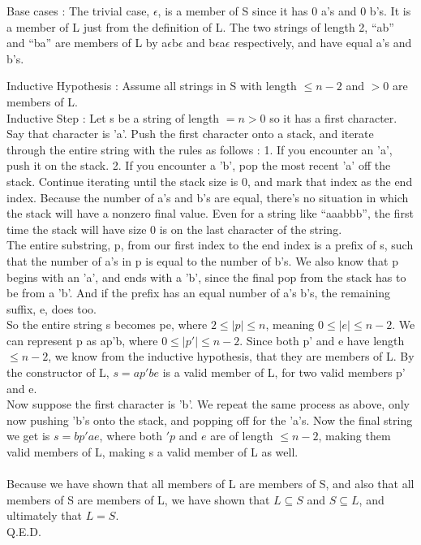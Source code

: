 \begin{enumerate}
  Base cases : The trivial case, $\epsilon$, is a member of S since it has 0 a's and 0 b's. It is a member of L just from the definition of L. The two strings of length 2, ``ab'' and ``ba'' are members of L by a$\epsilon$b$\epsilon$ and b$\epsilon$a$\epsilon$ respectively, and have equal a's and b's.
  
  Inductive Hypothesis : Assume all strings in S with length $\leq n-2$ and $> 0$ are members of L.\\

  Inductive Step : Let s be a string of length $ = n > 0$ so it has a first character. \\

  Say that character is 'a'. Push the first character onto a stack, and iterate through the entire string with the rules as follows : 1. If you encounter an 'a', push it on the stack. 2. If you encounter a 'b', pop the most recent 'a' off the stack. Continue iterating until the stack size is 0, and mark that index as the end index. Because the number of a's and b's are equal, there's no situation in which the stack will have a nonzero final value. Even for a string like ``aaabbb'', the first time the stack will have size 0 is on the last character of the string.\\
  The entire substring, p, from our first index to the end index is a prefix of s, such that the number of a's in p is equal to the number of b's. We also know that p begins with an 'a', and ends with a 'b', since the final pop from the stack has to be from a 'b'. And if the prefix has an equal number of a's b's, the remaining suffix, e, does too.\\
  So the entire string s becomes pe, where $2 \leq |p| \leq n$, meaning $0 \leq |e| \leq n-2$. We can represent p as ap'b, where $0 \leq |p'| \leq n-2$. Since both p' and e have length $\leq n-2$, we know from the inductive hypothesis, that they are members of L. By the constructor of L, $s = ap'be$ is a valid member of L, for two valid members p' and e.\\

  Now suppose the first character is 'b'. We repeat the same process as above, only now pushing 'b's onto the stack, and popping off for the 'a's. Now the final string we get is $s = bp'ae$, where both $'p$ and $e$ are of length $\leq n-2$, making them valid members of L, making s a valid member of L as well.\\\\

  Because we have shown that all members of L are members of S, and also that all members of S are members of L, we have shown that $L \subseteq S$ and $S \subseteq L$, and ultimately that $L = S$. \\
  Q.E.D.
  
  
\end{enumerate}

